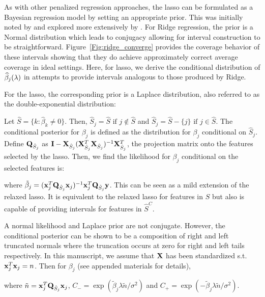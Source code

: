 
As with other penalized regression approaches, the lasso can be formulated as a Bayesian regression model by setting an appropriate prior. This was initially noted by \cite{Tibshirani1996} and explored more extensively by \cite{Park2008}.  For Ridge regression, the prior is a Normal distribution which leads to conjugacy allowing for interval construction to be straightforward. Figure~\ref{Fig:ridge_converge} provides the coverage behavior of these intervals showing that they do achieve approximately correct average coverage in ideal settings. Here, for lasso, we derive the conditional distribution of $\widehat{\beta}_j(\lambda)$ in attempts to provide intervals analogous to those produced by Ridge.

For the lasso, the corresponding prior is a Laplace distribution, also referred to as the double-exponential distribution:

Let $\hat{S} = \lbrace k: \hat{\beta}_k \neq  0 \rbrace$. Then, $\hat{S}_j = \hat{S} \text{ if } j \notin \hat{S}$ and $\hat{S}_j = \hat{S} - \lbrace j \rbrace \text{ if } j \in \hat{S}$. The conditional posterior for $\beta_j$ is defined as the distribution for $\beta_j$ conditional on $\hat{S}_j $. Define $\mathbf{Q}_{\hat{S}_j}$ as $\mathbf{I} - \mathbf{X}_{\hat{S}_j}(\mathbf{X}_{\hat{S}_j}^T \mathbf{X}_{\hat{S}_j})^{-1} \mathbf{X}_{\hat{S}_j}^T$, the projection matrix onto the features selected by the lasso. Then, we find the likelihood for $\beta_j$ conditional on the selected features is:

where $\tilde{\beta}_j = (\mathbf{x}_j^T \mathbf{Q}_{\hat{S}_j} \mathbf{x}_j)^{-1} \mathbf{x}_j^T \mathbf{Q}_{\hat{S}_j} \mathbf{y}$.  This can be seen as a mild extension of the relaxed lasso. It is equivalent to the relaxed lasso for features in $\hat{S}$ but also is capable of providing intervals for features in $\hat{S}^C$.

A normal likelihood and Laplace prior are not conjugate. However, the conditional posterior can be shown to be a composition of right and left truncated normals where the truncation occurs at zero for right and left tails respectively. In this manuscript, we assume that $\mathbf{X}$ has been standardized s.t. $\mathbf{x}_j^T\mathbf{x}_j = n$. Then for $\beta_j$ (see appended materials for details),

where $\tilde{n} = \mathbf{x}_j^T \mathbf{Q}_{\hat{S}_j} \mathbf{x}_j$, $C_{-} = \exp(\tilde{\beta}_j \lambda \tilde{n}/\sigma^2)$ and $C_{+} = \exp(-\tilde{\beta}_j \lambda \tilde{n}/\sigma^2)$.

